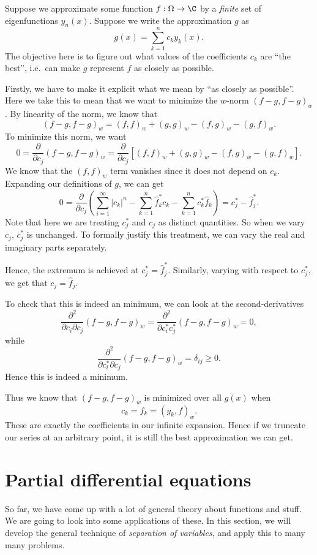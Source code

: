 \documentclass[a4paper]{article}
\begin{document}
Suppose we approximate some function $f: \Omega \to \C$ by a \emph{finite} set of eigenfunctions $y_n(x)$. Suppose we write the approximation $g$ as
\[
  g(x) = \sum_{k = 1}^n c_k y_k(x).
\]
The objective here is to figure out what values of the coefficients $c_k$ are ``the best'', i.e.\ can make $g$ represent $f$ as closely as possible.

Firstly, we have to make it explicit what we mean by ``as closely as possible''. Here we take this to mean that we want to minimize the $w$-norm $(f - g, f - g)_w$. By linearity of the norm, we know that
\[
  (f - g, f - g)_w = (f, f)_w + (g, g)_w - (f, g)_w - (g, f)_w.
\]
To minimize this norm, we want
\[
  0 = \frac{\partial}{\partial c_j} (f - g, f - g)_w = \frac{\partial}{\partial c_j}[(f, f)_w + (g, g)_w - (f, g)_w - (g, f)_w].
\]
We know that the $(f, f)_w$ term vanishes since it does not depend on $c_k$. Expanding our definitions of $g$, we can get
\[
  0 = \frac{\partial}{\partial c_j}\left(\sum_{i = 1}^\infty |c_k|^n - \sum_{k = 1}^n \hat{f}_k^* c_k - \sum_{k = 1}^n c_k^* \hat{f}_k\right) = c^*_j - \hat{f}_j^*.
\]
Note that here we are treating $c_j^*$ and $c_j$ as distinct quantities. So when we vary $c_j$, $c_j^*$ is unchanged. To formally justify this treatment, we can vary the real and imaginary parts separately.

Hence, the extremum is achieved at $c_j^* = \hat{f}_j^*$. Similarly, varying with respect to $c_j^*$, we get that $c_j = \hat{f}_j$.

To check that this is indeed an minimum, we can look at the second-derivatives
\[
  \frac{\partial^2}{\partial c_i \partial c_j} (f - g, f - g)_w = \frac{\partial^2}{\partial c_i^* c_j^*} (f - g, f - g)_w = 0,
\]
while
\[
  \frac{\partial^2}{\partial c_i^* \partial c_j} (f - g, f - g)_w = \delta_{ij} \geq 0.
\]
Hence this is indeed a minimum.

Thus we know that $(f - g, f - g)_w$ is minimized over all $g(x)$ when
\[
  c_k = \hat{f}_k = (y_k, f)_w.
\]
These are exactly the coefficients in our infinite expansion. Hence if we truncate our series at an arbitrary point, it is still the best approximation we can get.

\section{Partial differential equations}
So far, we have come up with a lot of general theory about functions and stuff. We are going to look into some applications of these. In this section, we will develop the general technique of \emph{separation of variables}, and apply this to many many problems.
\end{document}

